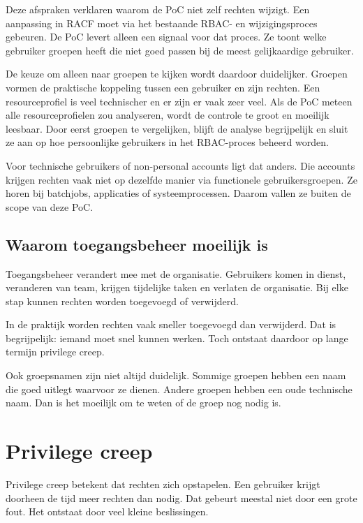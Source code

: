 Deze afspraken verklaren waarom de PoC niet zelf rechten wijzigt. Een aanpassing in RACF moet via het bestaande RBAC- en wijzigingsproces gebeuren. De PoC levert alleen een signaal voor dat proces. Ze toont welke gebruiker groepen heeft die niet goed passen bij de meest gelijkaardige gebruiker.

De keuze om alleen naar groepen te kijken wordt daardoor duidelijker. Groepen vormen de praktische koppeling tussen een gebruiker en zijn rechten. Een resourceprofiel is veel technischer en er zijn er vaak zeer veel. Als de PoC meteen alle resourceprofielen zou analyseren, wordt de controle te groot en moeilijk leesbaar. Door eerst groepen te vergelijken, blijft de analyse begrijpelijk en sluit ze aan op hoe persoonlijke gebruikers in het RBAC-proces beheerd worden.

Voor technische gebruikers of non-personal accounts ligt dat anders. Die accounts krijgen rechten vaak niet op dezelfde manier via functionele gebruikersgroepen. Ze horen bij batchjobs, applicaties of systeemprocessen. Daarom vallen ze buiten de scope van deze PoC.

\subsection*{Waarom toegangsbeheer moeilijk is}

Toegangsbeheer verandert mee met de organisatie. Gebruikers komen in dienst, veranderen van team, krijgen tijdelijke taken en verlaten de organisatie. Bij elke stap kunnen rechten worden toegevoegd of verwijderd.

In de praktijk worden rechten vaak sneller toegevoegd dan verwijderd. Dat is begrijpelijk: iemand moet snel kunnen werken. Toch ontstaat daardoor op lange termijn privilege creep.

Ook groepsnamen zijn niet altijd duidelijk. Sommige groepen hebben een naam die goed uitlegt waarvoor ze dienen. Andere groepen hebben een oude technische naam. Dan is het moeilijk om te weten of de groep nog nodig is.

\section{Privilege creep}

Privilege creep betekent dat rechten zich opstapelen. Een gebruiker krijgt doorheen de tijd meer rechten dan nodig. Dat gebeurt meestal niet door een grote fout. Het ontstaat door veel kleine beslissingen.

